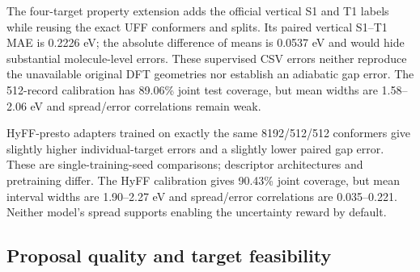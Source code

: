 \documentclass[11pt,a4paper]{article}
\begin{document}
The four-target property extension adds the official vertical S1 and T1
labels while reusing the exact UFF conformers and splits. Its paired
vertical S1--T1 MAE is 0.2226 eV; the absolute difference of means is
0.0537 eV and would hide substantial molecule-level errors. These
supervised CSV errors neither reproduce the unavailable original DFT
geometries nor establish an adiabatic gap error. The 512-record
calibration has 89.06\% joint test coverage, but mean widths are
1.58--2.06 eV and spread/error correlations remain weak.

HyFF-presto adapters trained on exactly the same 8192/512/512 conformers
give slightly higher individual-target errors and a slightly lower
paired gap error. These are single-training-seed comparisons; descriptor
architectures and pretraining differ. The HyFF calibration gives 90.43\%
joint coverage, but mean interval widths are 1.90--2.27 eV and
spread/error correlations are 0.035--0.221. Neither model's spread
supports enabling the uncertainty reward by default.

\FloatBarrier
\subsection{Proposal quality and target
feasibility}\label{proposal-quality-and-target-feasibility}
\end{document}
